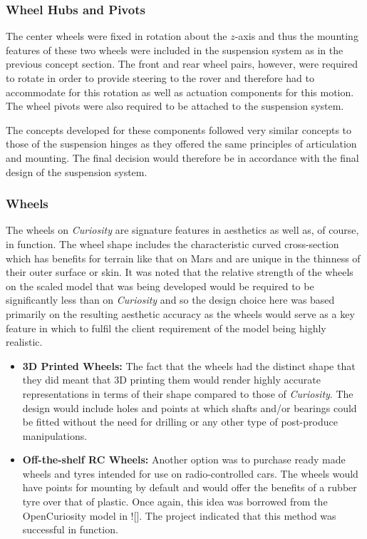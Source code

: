     \subsubsection{Wheel Hubs and Pivots}
      The center wheels were fixed in rotation about the $z$-axis and thus the mounting features of these two wheels were included in the suspension system as in the previous concept section. The front and rear wheel pairs, however, were required to rotate in order to provide steering to the rover and therefore had to accommodate for this rotation as well as actuation components for this motion. The wheel pivots were also required to be attached to the suspension system.
      
      The concepts developed for these components followed very similar concepts to those of the suspension hinges as they offered the same principles of articulation and mounting. The final decision would therefore be in accordance with the final design of the suspension system.
      
    \subsubsection{Wheels}
      The wheels on \textit{Curiosity} are signature features in aesthetics as well as, of course, in function. The wheel shape includes the characteristic curved cross-section which has benefits for terrain like that on Mars and are unique in the thinness of their outer surface or skin. It was noted that the relative strength of the wheels on the scaled model that was being developed would be required to be significantly less than on \textit{Curiosity} and so the design choice here was based primarily on the resulting aesthetic accuracy as the wheels would serve as a key feature in which to fulfil the client requirement of the model being highly realistic.
      
      \begin{itemize}
        \item \textbf{3D Printed Wheels:} The fact that the wheels had the distinct shape that they did meant that 3D printing them would render highly accurate representations in terms of their shape compared to those of \textit{Curiosity}. The design would include holes and points at which shafts and/or bearings could be fitted without the need for drilling or any other type of post-produce manipulations.
        
        \item \textbf{Off-the-shelf RC Wheels:} Another option was to purchase ready made wheels and tyres intended for use on radio-controlled cars. The wheels would have points for mounting by default and would offer the benefits of a rubber tyre over that of plastic. Once again, this idea was borrowed from the OpenCuriosity model in ![]. The project indicated that this method was successful in function.
      \end{itemize}
      
